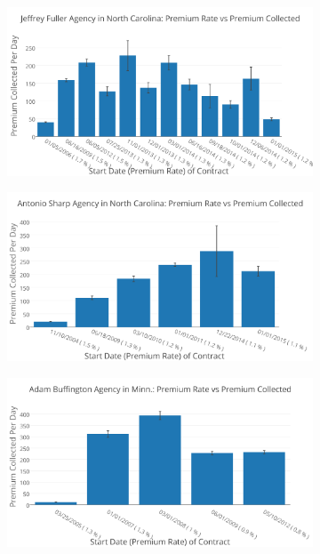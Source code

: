 \documentclass{article}
\begin{document}
\begin{center}
\begin{figure}[H]
\begin{subfigure}[b]{0.5\textwidth}
\includegraphics[width=\textwidth]{Jeffrey_Fuller_Agency_in_North_Carolina-_Premium_Rate_vs_Premium_Collected.png}
\end{subfigure}
\begin{subfigure}[b]{0.5\textwidth}
\includegraphics[width=\textwidth]{Antonio_Sharp_Agency_in_North_Carolina-_Premium_Rate_vs_Premium_Collected.png}
\end{subfigure}
\begin{subfigure}[b]{0.5\textwidth}
\includegraphics[width=\textwidth]{Adam_Buffington_Agency_in_Minn-_Premium_Rate_vs_Premium_Collected.png}

\end{subfigure}
\end{figure}
\end{center}
\end{document}
